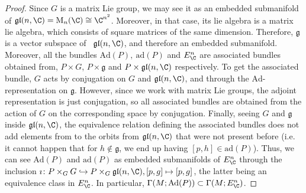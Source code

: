 \begin{proof}
    Since \(G\) is a matrix Lie group, we may see it as an embedded submanifold of \(\mathfrak{gl}(n, \C)=\mathrm{M}_n(\C) \cong \C^{n^2}\). Moreover, in that case, its lie algebra is a matrix lie algebra, which consists of square matrices of the same dimension. Therefore, \(\mathfrak{g}\) is a vector subspace of \
    \(\mathfrak{gl}(n, \C)\), and therefore an embedded submanifold. Moreover, all the bundles \(\mathrm{Ad}(P), \  \mathrm{ad}(P)\) and \(E_\C^n\) are associated bundles obtained from, \(P \times G\), \(P \times \mathfrak{g}\) and \(P \times \mathfrak{gl}(n, \C)\) respectively. To get the associated bundle, \(G\) acts by conjugation on \(G\) and \(\mathfrak{gl}(n, \C)\), and through the \(\mathrm{Ad}\)-representation on \(\mathfrak{g}\). However, since we work with matrix Lie groups, the adjoint representation is just conjugation, so all associated bundles are obtained from the action of \(G\) on the corresponding space by conjugation. Finally, seeing \(G\) and \(\mathfrak{g}\) inside \(\mathfrak{gl}(n, \C)\), the equivalence relation defining the associated bundles does not add elements from to the orbits from \(\mathfrak{gl}(n, \C)\) that were not present before (i.e. it cannot happen that for \(h \notin \mathfrak{g}\), we end up having \([p,h] \in \mathrm{ad}(P)\)). Thus, we can see \(\mathrm{Ad}(P)\) and \(\mathrm{ad}(P)\) as {\color{red}embedded submanifolds} of \(E_\C^n\) through the inclusion \(\imath\colon P \times_G G \hookrightarrow P \times _G \mathfrak{gl}(n, \C), [p, g] \mapsto [p,g]\), the latter being an equivalence class in \(E_\C^n\). In particular, \(\Gamma(M; \mathrm{Ad}(P)) \subset \Gamma(M; E_\C^n)\).
\end{proof}


